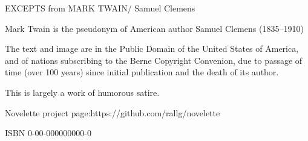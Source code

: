 \documentclass[../interior-demo.tex]{subfiles}
\begin{document}
\begin{fullpage} %
\null\null\null\null\null %
\null\null\null %
\vfill %
\end{fullpage}

\begin{copyrightpage}
\vfill %
EXCEPTS from MARK TWAIN\br/ Samuel Clemens\par
Mark Twain is the pseudonym of American\br
author Samuel Clemens (1835--1910)\par
The text and image are in the Public Domain\br
of the United States of America, and of nations\br
subscribing to the Berne Copyright Convenion,\br
due to passage of time (over 100 years) since\br
initial publication and the death of its author.\par
This is largely a work of humorous satire.\par
Novelette project page:\br https://github.com/rallg/novelette\par
ISBN 0-00-000000000-0\par
\end{copyrightpage}
\end{document}
